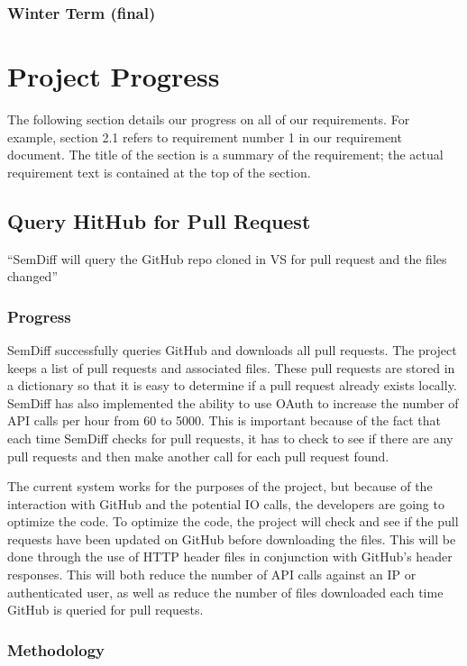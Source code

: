 \documentclass[10pt,draftclsnofoot,onecolumn]{IEEEtran}
\begin{document}
\subsubsection{Winter Term (final)}


\section{Project Progress}
The following section details our progress on all of our requirements. For example, section 2.1 refers to requirement number 1 in our requirement document. The title of the section is a summary of the requirement; the actual requirement text is contained at the top of the section.

\subsection{Query HitHub for Pull Request}
“SemDiff will query the GitHub repo cloned in VS for pull request and the files changed”

\subsubsection{Progress}
SemDiff successfully queries GitHub and downloads all pull requests. The project keeps a list of pull requests and associated files. These pull requests are stored in a dictionary so that it is easy to determine if a pull request already exists locally. SemDiff has also implemented the ability to use OAuth to increase the number of API calls per hour from 60 to 5000. This is important because of the fact that each time SemDiff checks for pull requests, it has to check to see if there are any pull requests and then make another call for each pull request found.

The current system works for the purposes of the project, but because of the interaction with GitHub and the potential IO calls, the developers are going to optimize the code. To optimize the code, the project will check and see if the pull requests have been updated on GitHub before downloading the files. This will be done through the use of HTTP header files in conjunction with GitHub’s header responses. This will both reduce the number of API calls against an IP or authenticated user, as well as reduce the number of files downloaded each time GitHub is queried for pull requests. 

\subsubsection{Methodology}
\end{document}
